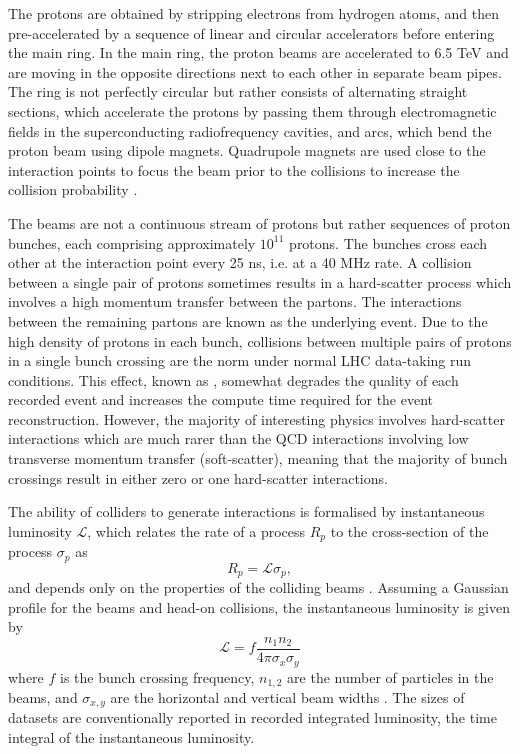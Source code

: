 The protons are obtained by stripping electrons from hydrogen atoms,
and then pre-accelerated by a sequence of linear and circular accelerators
before entering the main ring. In the main ring, the proton beams are
accelerated to 6.5 TeV and are moving in the opposite directions next to each other
in separate beam pipes. The ring is not perfectly circular but rather consists
of alternating straight sections, which accelerate the protons by passing
them through electromagnetic fields in the superconducting radiofrequency
cavities, and arcs, which bend the proton beam using dipole magnets.
Quadrupole magnets are used close to the interaction points to focus the
beam prior to the collisions to increase the collision probability \cite{Brüning:782076}. 

The beams are not a continuous stream of protons but rather sequences of
proton bunches, each comprising approximately $10^{11}$ protons. The
bunches cross each other at the interaction point every 25 ns, i.e. at a
40 MHz rate. A collision between a single pair of protons sometimes results in
a hard-scatter process which involves a high momentum transfer between the partons.
The interactions between the remaining partons are known as the
underlying event. Due to the high density of protons in each bunch,
collisions between multiple pairs of protons in a single bunch crossing
are the norm under normal LHC data-taking run conditions.
This effect, known as \pileup, somewhat degrades the quality of
each recorded event and increases the compute time required for the
event reconstruction. However, the majority of interesting physics
involves hard-scatter interactions which are much rarer than the QCD
interactions involving low transverse momentum transfer (soft-scatter),
meaning that the majority of bunch crossings result in either zero or
one hard-scatter interactions.

The ability of colliders to generate interactions is formalised by
instantaneous luminosity $\mathcal{L}$, which relates the rate of a process $R_p$
to the cross-section of the process $\sigma_p$ as
\begin{equation}
R_p = \mathcal{L} \sigma_p,
\end{equation}
and depends only on the properties of the colliding beams \cite{Thomson:2013zua}. Assuming a
Gaussian profile for the beams and head-on collisions, the
instantaneous luminosity is given by
\begin{equation}
\mathcal{L} = f \frac{n_1 n_2 }{4 \pi \sigma_x \sigma_y}
\end{equation}
where $f$ is the bunch crossing frequency, $n_{1, 2}$ are the number of
particles in the beams, and $\sigma_{x,y}$ are the horizontal and vertical
beam widths \cite{Thomson:2013zua}. The sizes of datasets are conventionally
reported in recorded integrated luminosity, the time integral of the
instantaneous luminosity. 

